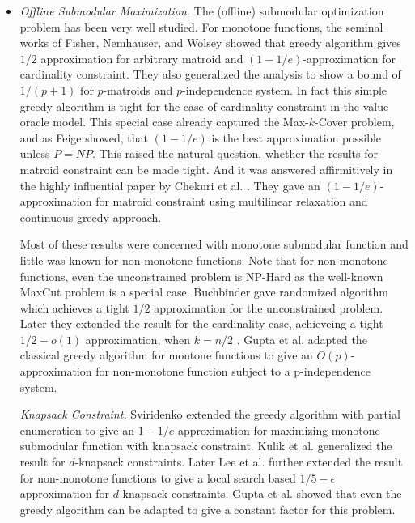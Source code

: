 \documentclass[oneside,letterpaper]{scrartcl} \usepackage{macros}
\begin{document}
\iffalse
\begin{itemize}
\item \textit{Offline Submodular Maximization.} The (offline)
  submodular optimization problem has been very well studied. For
  monotone functions, the seminal works of Fisher, Nemhauser, and
  Wolsey \cite{nwf-mssf1-78} showed that greedy algorithm gives $1/2$
  approximation for arbitrary matroid and $(1-1/e)$-approximation for
  cardinality constraint. They also generalized the analysis to show a
  bound of $1/(p+1)$ for $p$-matroids and $p$-independence system. In
  fact this simple greedy algorithm is tight for the case of
  cardinality constraint in the value oracle model. This special case
  already captured the Max-$k$-Cover problem, and as Feige \cite{f-98}
  showed, that $(1-1/e)$ is the best approximation possible unless
  $P=NP$. This raised the natural question, whether the results for
  matroid constraint can be made tight. And it was answered
  affirmitively in the highly influential paper by Chekuri et
  al. \cite{ccpv-11}. They gave an $(1-1/e)$-approximation for matroid
  constraint using multilinear relaxation and continuous greedy
  approach.

  Most of these results were concerned with monotone submodular
  function and little was known for non-monotone functions. Note that
  for non-monotone functions, even the unconstrained problem is
  NP-Hard as the well-known MaxCut problem is a special
  case. Buchbinder \etal \cite{bfjs-12} gave randomized algorithm
  which achieves a tight $1/2$ approximation for the unconstrained
  problem. Later they extended the result for the cardinality case,
  achieveing a tight $1/2 - o(1)$ approximation, when $k = n/2$
  \cite{bfns-smcc-14}. Gupta et al. \cite{grst-10} adapted the
  classical greedy algorithm for montone functions to give an
  $O(p)$-approximation for non-monotone function subject to a
  p-independence system.

  \textit{Knapsack Constraint.} Sviridenko extended the greedy
  algorithm with partial enumeration to give an $1 - 1/e$
  approximation for maximizing monotone submodular function with
  knapsack constraint. Kulik et al. \cite{kst-11} generalized the
  result for $d$-knapsack constraints. Later Lee et al. \cite{lmns-09}
  further extended the result for non-monotone functions to give a
  local search based $1/5 - \epsilon$ approximation for $d$-knapsack
  constraints. Gupta et al. \cite{grst-10} showed that even the greedy
  algorithm can be adapted to give a constant factor for this problem.


\end{itemize}
\end{document}
